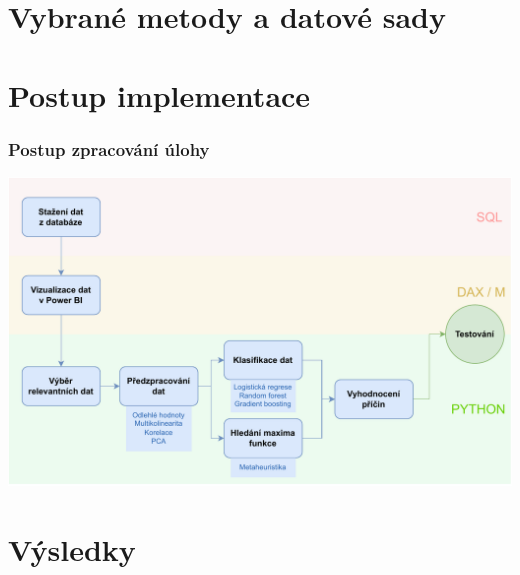 \documentclass{beamer}
\theoremstyle{definition}
\begin{document}
\section{Vybrané metody a datové sady}
 


\section{Postup implementace}

\begin{frame}
    \frametitle{Postup zpracování úlohy}
	\vspace{0.7cm}
	\includegraphics[width=\textwidth]{pipelineDP.drawio.pdf}
\end{frame}

\section{Výsledky}
   
\end{document}
